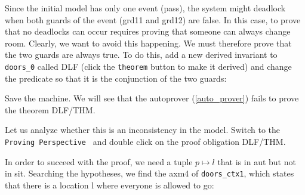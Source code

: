 Since the initial model has only one event (\textsf{pass}), the system might deadlock when both guards of the event (\textsf{grd11} and \textsf{grd12}) are false. In this case, to prove that no deadlocks can occur requires proving that someone can always change room. Clearly, we want to avoid this happening. We must therefore prove that the two guards are always true. To do this, add a new derived invariant to \texttt{doors\_0} called \textsf{DLF} (click the \texttt{theorem} button to make it derived) and change the predicate so that it is the conjunction of the two guards:

\begin{description}
\INVARIANTS
	\begin{description}
	\end{description}
\end{description}


Save the machine. We will see that the autoprover (\ref{auto_prover}) fails to prove the theorem \textsf{DLF/THM}.


Let us analyze whether this is an inconsistency in the model. Switch to the \texttt{Proving Perspective } and double click on the proof obligation \textsf{DLF/THM}.



In order to succeed with the proof, we need a tuple $p \mapsto l$ that is in \textsf{aut} but not in \textsf{sit}. Searching the hypotheses, we find the \textsf{axm4} of \texttt{doors\_ctx1}, which states that there is a location \textsf{l} where everyone is allowed to go:

\begin{description}
\AXIOMS
	\begin{description}
		\nItemX{ axm4 }{ \exists l\qdot l\in L\setminus \{ outside\}  \land  P\cprod \{ l\} \subseteq aut }
	\end{description}
\end{description}

